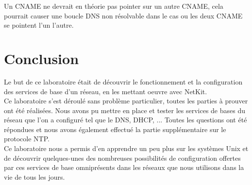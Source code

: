 \documentclass{article}
\begin{document}
Un CNAME ne devrait en théorie pas pointer sur un autre CNAME, cela pourrait causer une boucle DNS non résolvable dans le cas ou les deux CNAME se pointent l'un l'autre.\cite{cname-limitations}\\

\section{Conclusion}
Le but de ce laboratoire était de découvrir le fonctionnement et la configuration des services de base d'un réseau, en les mettant oeuvre avec NetKit.\\

Ce laboratoire s’est déroulé sans problème particulier, toutes les parties à prouver ont été réalisées. Nous avons pu mettre en place et tester les services de bases du réseau que l'on a configuré tel que le DNS, DHCP, ... Toutes les questions ont été répondues et nous avons également effectué la partie supplémentaire sur le protocole NTP.\\

Ce laboratoire nous a permis d'en apprendre un peu plus sur les systèmes Unix et de découvrir quelques-unes des nombreuses possibilités de configuration offertes par ces services de base omniprésents dans les réseaux que nous utilisons dans la vie de tous les jours.

\newpage
\printbibliography
\end{document}
